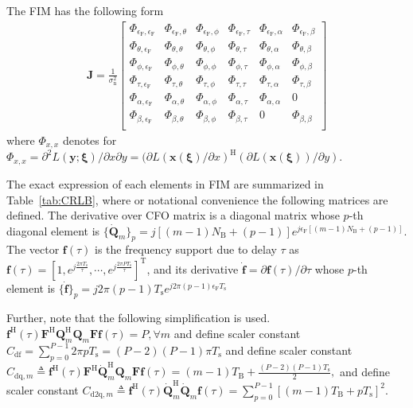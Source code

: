 \documentclass[journal]{IEEEtran}
\newcommand{\hermitian}[0]{\text{H}}
\newcommand{\transpose}[0]{\text{T}}
\newcommand{\CFO}[0]{\epsilon_{\text{F}}}
\newcommand{\Ts}[0]{T_{\text{s}}}
\newcommand{\Tb}[0]{T_{\text{B}}}
\newcommand{\Nb}[0]{N_{\text{B}}}
\newcommand{\sigman}[0]{\sigma_{\text{n}}}
\begin{document}
The FIM has the following form
\begin{align}
\mathbf{J} = \frac{1}{\sigman^2}
\begin{bmatrix}
\Phi_{\CFO,\CFO} & \Phi_{\CFO,\theta} & \Phi_{\CFO,\phi} & \Phi_{\CFO,\tau} & \Phi_{\CFO,\alpha} & \Phi_{\CFO,\beta}\\
\Phi_{\theta,\CFO}  & \Phi_{\theta,\theta} & \Phi_{\theta,\phi} &  \Phi_{\theta,\tau} & \Phi_{\theta,\alpha} & \Phi_{\theta,\beta}\\
\Phi_{\phi,\CFO}  & \Phi_{\phi,\theta} & \Phi_{\phi,\phi} &  \Phi_{\phi,\tau} & \Phi_{\phi,\alpha}& \Phi_{\phi,\beta}\\
\Phi_{\tau,\CFO} & \Phi_{\tau,\theta} & \Phi_{\tau,\phi} &  \Phi_{\tau,\tau} & \Phi_{\tau,\alpha} & \Phi_{\tau,\beta}\\
\Phi_{\alpha,\CFO} & \Phi_{\alpha,\theta} & \Phi_{\alpha,\phi} &  \Phi_{\alpha,\tau} & \Phi_{\alpha,\alpha} & 0 \\
\Phi_{\beta,\CFO} & \Phi_{\beta,\theta} & \Phi_{\beta,\phi} &  \Phi_{\beta,\tau} &  0 &\Phi_{\beta,\beta} \\
\end{bmatrix}
\label{eq:FIM}
\end{align}
where $\Phi_{x,x}$ denotes for $\Phi_{x,x} = \partial^2 L(\mathbf{y};\boldsymbol{\xi})/\partial x \partial y=(\partial L(\mathbf{x}(\boldsymbol{\xi})/\partial x)^{\hermitian}(\partial L(\mathbf{x}(\boldsymbol{\xi}))/\partial y)$. 

The exact expression of each elements in FIM are summarized in Table~\ref{tab:CRLB}, where or notational convenience the following matrices are defined. The derivative over CFO matrix is a diagonal matrix whose $p$-th diagonal element is $\{\dot{\mathbf{Q}}_m\}_p = j[(m-1)\Nb +(p-1)]e^{j\CFO[(m-1)\Nb +(p-1)]}$. The vector $\mathbf{f}(\tau)$ is the frequency support due to delay $\tau$ as $\mathbf{f}(\tau) = [1,e^{j\frac{2\pi\Ts}{\tau}},\cdots,e^{j\frac{2\pi P \Ts}{\tau}}]^{\transpose}$, and its derivative $\dot{\mathbf{f}} = \partial \mathbf{f}(\tau)/\partial \tau$ whose $p$-th element is $\{\dot{\mathbf{f}}\}_p = 
j2\pi(p-1)\Ts e^{j2\pi(p-1)\CFO \Ts}$

Further, note that the following simplification is used. $\mathbf{f}^{\hermitian}(\tau)\mathbf{F}^{\hermitian}\mathbf{Q}_m^{\hermitian}\mathbf{Q}_m\mathbf{F}\mathbf{f}(\tau) = P, \forall m$ and  define scaler constant $C_{\text{df}} 
= \sum_{p=0}^{P-1} 2\pi p \Ts = (P-2)(P-1)\pi \Ts$ and define scaler constant $C_{\text{dq},m} \triangleq {\mathbf{f}}^{\hermitian}(\tau)\mathbf{F}^{\hermitian}\dot{\mathbf{Q}}_m^{\hermitian}\mathbf{Q}_m\mathbf{F}\mathbf{f}(\tau)  
=(m-1)\Tb + \frac{(P-2)(P-1)\Ts}{2},$ 
and define scaler constant $C_{\text{d2q},m} \triangleq {\mathbf{f}}^{\hermitian}(\tau)\dot{\mathbf{Q}}_m^{\hermitian}\dot{\mathbf{Q}}_m\mathbf{f}(\tau) = \sum_{p=0}^{P-1}\left[(m-1)\Tb+p\Ts\right]^2$. 
\end{document}
